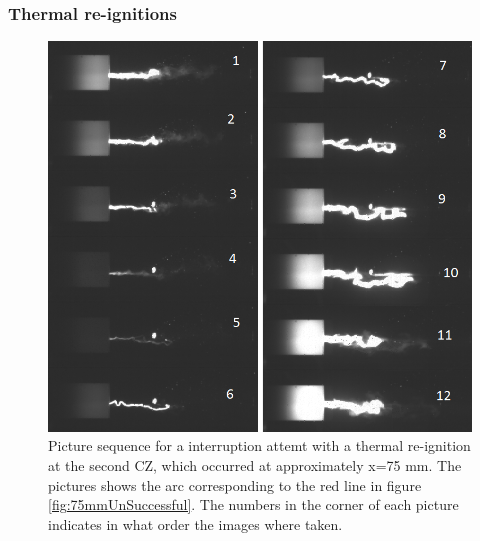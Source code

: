 \documentclass[10pt,b5paper,twoside]{article}
\begin{document}
\subsubsection{Thermal re-ignitions}
\begin{figure}[H]
\centering
\includegraphics[scale=0.7, angle =0 ]{Bilder/Results/073_75_TR_TR.png}
\caption{Picture sequence for a interruption attemt with a thermal re-ignition at the second CZ, which occurred at approximately x=75 mm. The pictures shows the arc corresponding to the red line in figure \ref{fig:75mmUnSuccessful}. The numbers in the corner of each picture indicates in what order the images where taken.} \label{fig:arcingVoltage_test_73_red_TR}
\end{figure}
\end{document}
